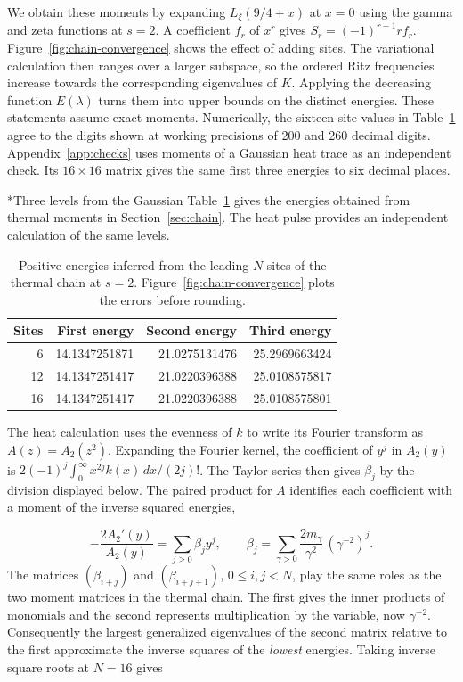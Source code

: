 \documentclass[11pt,letterpaper]{article}
\makeatletter
\renewcommand\subsection{\@startsection{subsection}{2}{\z@}{-2.0ex plus -.3ex}{.75ex}{\normalfont\normalsize\itshape}}
\numberwithin{equation}{section}
\makeatother
\begin{document}
We obtain these moments by expanding $L_\xi(9/4+x)$ at $x=0$ using the gamma and zeta functions at $s=2$. A coefficient $f_r$ of $x^r$ gives $S_r=(-1)^{r-1}r f_r$. Figure~\ref{fig:chain-convergence} shows the effect of adding sites. The variational calculation then ranges over a larger subspace, so the ordered Ritz frequencies increase towards the corresponding eigenvalues of $K$. Applying the decreasing function $E(\lambda)$ turns them into upper bounds on the distinct energies. These statements assume exact moments. Numerically, the sixteen-site values in Table~\ref{tab:chain} agree to the digits shown at working precisions of 200 and 260 decimal digits. Appendix~\ref{app:checks} uses moments of a Gaussian heat trace as an independent check. Its $16\times16$ matrix gives the same first three energies to six decimal places.

\subsection*{Three levels from the Gaussian}
Table~\ref{tab:chain} gives the energies obtained from thermal moments in Section~\ref{sec:chain}. The heat pulse provides an independent calculation of the same levels.

\begin{table}[!htb]
\centering
\begin{tabular}{r@{\qquad}rrr}
\hline
Sites & First energy & Second energy & Third energy \\
\hline
6  & 14.1347251871 & 21.0275131476 & 25.2969663424 \\
12 & 14.1347251417 & 21.0220396388 & 25.0108575817 \\
16 & 14.1347251417 & 21.0220396388 & 25.0108575801 \\
\hline
\end{tabular}
\caption{Positive energies inferred from the leading $N$ sites of the thermal chain at $s=2$. Figure~\ref{fig:chain-convergence} plots the errors before rounding.}
\label{tab:chain}
\end{table}

The heat calculation uses the evenness of $k$ to write its Fourier transform as $A(z)=A_2(z^2)$. Expanding the Fourier kernel, the coefficient of $y^j$ in $A_2(y)$ is $2(-1)^j\int_0^\infty x^{2j}k(x)\,dx/(2j)!$. The Taylor series then gives $\beta_j$ by the division displayed below. The paired product for $A$ identifies each coefficient with a moment of the inverse squared energies,

\begin{equation}
 -\frac{2A_2'(y)}{A_2(y)}=\sum_{j\ge0}\beta_jy^j,\qquad
 \beta_j=\sum_{\gamma>0}\frac{2m_\gamma}{\gamma^2}\,(\gamma^{-2})^j .
 \label{eq:ritz}
\end{equation}
The matrices $(\beta_{i+j})$ and $(\beta_{i+j+1})$, $0\le i,j<N$, play the same roles as the two moment matrices in the thermal chain. The first gives the inner products of monomials and the second represents multiplication by the variable, now $\gamma^{-2}$. Consequently the largest generalized eigenvalues of the second matrix relative to the first approximate the inverse squares of the \emph{lowest} energies. Taking inverse square roots at $N=16$ gives
\end{document}
